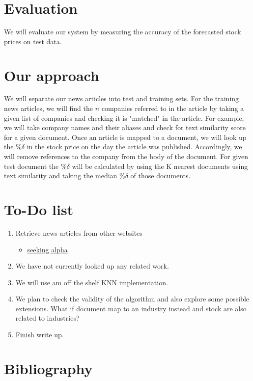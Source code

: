 \documentclass[11pt,letterpaper]{article}
\newcommand{\blue}[1]{\textcolor{RoyalBlue}{#1}}
\newcommand{\instructions}[1]{\blue{\textit{#1}}}
\renewcommand{\instructions}[1]{}
\begin{document}
\section*{Evaluation}
  We will evaluate our system by measuring the accuracy of the forecasted
  stock prices on test data.

\section*{Our approach}
  We will separate our news articles into test and training sets. For the training news
  articles, we will find the $n$ companies referred to in the article by taking a given
  list of companies and checking it is "matched" in the article. For example, we will
  take company names and their aliases and check for text similarity score for a given
  document. Once an article is mapped to a document, we will look up the $\%\delta$ in
  the stock price on the day the article was published. Accordingly, we will remove references
  to the company from the body of the document. For given test document the $\%\delta$
  will be calculated by using the K nearest documents using text similarity
  and taking the median $\%\delta$ of those documents.
\instructions{Describe how you want to tackle this task}

\section*{To-Do list}
\instructions{Get started by making a to-do list. If you have a group
  project: who will do what? Set yourself deadlines. Here are a few
  items that might appear on your to-do list}
\begin{enumerate}
\item Retrieve news articles from other websites
	\begin{itemize}
		\item \href{ http://seekingalpha.com/ } { seeking alpha }
	\end{itemize}
\item We have not currently looked up any related work.
\item We will use am off the shelf KNN implementation.
\item We plan to check the validity of the algorithm and also explore some possible
  extensions. What if document map to an industry instead and stock are also related
  to industries?
\item Finish write up.
\end{enumerate}

\section*{Bibliography}
{}

\end{document}
